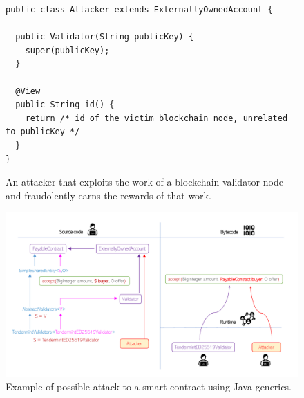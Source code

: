 \begin{figure}[t]
  \begin{center}
    \begin{lstlisting}[language=Takamaka]
public class Attacker extends ExternallyOwnedAccount {

  public Validator(String publicKey) {
    super(publicKey);
  }

  @View
  public String id() {
    return /* id of the victim blockchain node, unrelated to publicKey */
  }
}
    \end{lstlisting}
  \end{center}
  \caption{An attacker that exploits the work of a blockchain validator node and fraudolently earns the rewards of that work.}\label{fig:attacker}
\end{figure}

\begin{figure}[b]
\centering
\includegraphics[width=.9\linewidth]{figures/attack}
\caption{Example of possible attack to a smart contract using Java generics.}
\label{figure.attack}
\end{figure}


